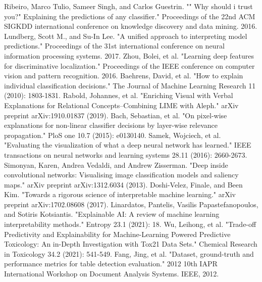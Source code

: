 \documentclass{JMLFS}
\begin{document}

\begin{thebibliography}{99}
 Ribeiro, Marco Tulio, Sameer Singh, and Carlos Guestrin. "" Why should i trust you?" Explaining the predictions of any classifier." Proceedings of the 22nd ACM SIGKDD international conference on knowledge discovery and data mining. 2016.
 Lundberg, Scott M., and Su-In Lee. "A unified approach to interpreting model predictions." Proceedings of the 31st international conference on neural information processing systems. 2017.
Zhou, Bolei, et al. "Learning deep features for discriminative localization." Proceedings of the IEEE conference on computer vision and pattern recognition. 2016.
 Baehrens, David, et al. "How to explain individual classification decisions." The Journal of Machine Learning Research 11 (2010): 1803-1831.
 Rabold, Johannes, et al. "Enriching Visual with Verbal Explanations for Relational Concepts--Combining LIME with Aleph." arXiv preprint arXiv:1910.01837 (2019).
 Bach, Sebastian, et al. "On pixel-wise explanations for non-linear classifier decisions by layer-wise relevance propagation." PloS one 10.7 (2015): e0130140.
 Samek, Wojciech, et al. "Evaluating the visualization of what a deep neural network has learned." IEEE transactions on neural networks and learning systems 28.11 (2016): 2660-2673.
 Simonyan, Karen, Andrea Vedaldi, and Andrew Zisserman. "Deep inside convolutional networks: Visualising image classification models and saliency maps." arXiv preprint arXiv:1312.6034 (2013).
 Doshi-Velez, Finale, and Been Kim. "Towards a rigorous science of interpretable machine learning." arXiv preprint arXiv:1702.08608 (2017).
 Linardatos, Pantelis, Vasilis Papastefanopoulos, and Sotiris Kotsiantis. "Explainable AI: A review of machine learning interpretability methods." Entropy 23.1 (2021): 18.
 Wu, Leihong, et al. "Trade-off Predictivity and Explainability for Machine-Learning Powered Predictive Toxicology: An in-Depth Investigation with Tox21 Data Sets." Chemical Research in Toxicology 34.2 (2021): 541-549.
Fang, Jing, et al. "Dataset, ground-truth and performance metrics for table detection evaluation." 2012 10th IAPR International Workshop on Document Analysis Systems. IEEE, 2012.


\end{thebibliography}
\end{document}

